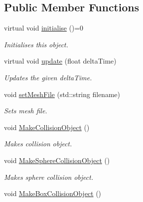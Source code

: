 \subsection*{Public Member Functions}
\begin{DoxyCompactItemize}
\item 
\hypertarget{class_objects_1_1_i_object_a932898790e2babe2ba4c95c561f862e8}{virtual void \hyperlink{class_objects_1_1_i_object_a932898790e2babe2ba4c95c561f862e8}{initialise} ()=0}\label{class_objects_1_1_i_object_a932898790e2babe2ba4c95c561f862e8}

\begin{DoxyCompactList}\small\item\em Initialises this object. \end{DoxyCompactList}\item 
virtual void \hyperlink{class_objects_1_1_i_object_a616e6befc5fbdca47155b1b56d0e0fc0}{update} (float delta\-Time)
\begin{DoxyCompactList}\small\item\em Updates the given delta\-Time. \end{DoxyCompactList}\item 
void \hyperlink{class_objects_1_1_i_object_abb8bb5097d1600f4e5d0aea2cd148247}{set\-Mesh\-File} (std\-::string filename)
\begin{DoxyCompactList}\small\item\em Sets mesh file. \end{DoxyCompactList}\item 
\hypertarget{class_objects_1_1_i_object_a8043777b3c370b2f422319a552373bc0}{void \hyperlink{class_objects_1_1_i_object_a8043777b3c370b2f422319a552373bc0}{Make\-Collision\-Object} ()}\label{class_objects_1_1_i_object_a8043777b3c370b2f422319a552373bc0}

\begin{DoxyCompactList}\small\item\em Makes collision object. \end{DoxyCompactList}\item 
\hypertarget{class_objects_1_1_i_object_a8e42f185ed7088ed7b4143f9dee1b55a}{void \hyperlink{class_objects_1_1_i_object_a8e42f185ed7088ed7b4143f9dee1b55a}{Make\-Sphere\-Collision\-Object} ()}\label{class_objects_1_1_i_object_a8e42f185ed7088ed7b4143f9dee1b55a}

\begin{DoxyCompactList}\small\item\em Makes sphere collision object. \end{DoxyCompactList}\item 
\hypertarget{class_objects_1_1_i_object_a8a0f5bc968be8a37a746e8079333b0f9}{void \hyperlink{class_objects_1_1_i_object_a8a0f5bc968be8a37a746e8079333b0f9}{Make\-Box\-Collision\-Object} ()}\label{class_objects_1_1_i_object_a8a0f5bc968be8a37a746e8079333b0f9}


\end{DoxyCompactItemize}
